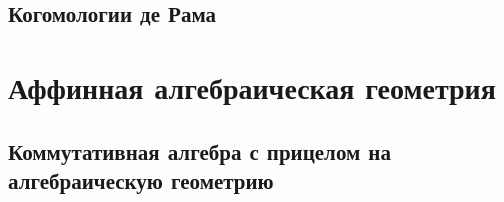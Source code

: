 \documentclass[dvipsnames, 11pt]{book}
\begin{document}
    \section{Когомологии де Рама}

    
    
    
    
    
    
    
    

    

    \chapter{Аффинная алгебраическая геометрия }
    \section{Коммутативная алгебра с прицелом на алгебраическую геометрию}


    
    
    
    
    
    
    

    
    
        
    
    
    
    
    
    
    
\end{document}
